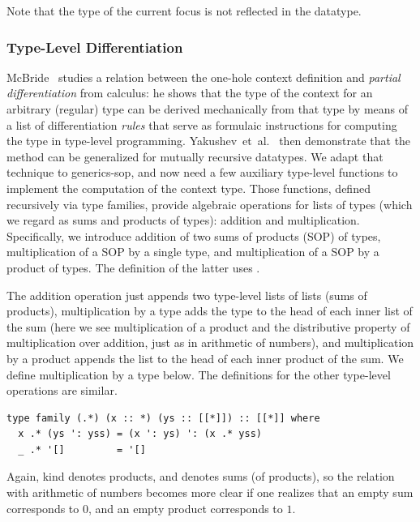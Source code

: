 \documentclass[sigplan,screen,review,anonymous]{acmart}
\begin{document}
Note that the type of the current focus is not reflected in the  datatype.

\subsubsection{Type-Level Differentiation}

McBride~\cite{McBride2001} studies a relation between the one-hole context definition and \emph{partial differentiation} from calculus: he shows that the type of the context for an arbitrary (regular) type can be derived mechanically from that type by means of a list of differentiation \emph{rules} that serve as formulaic instructions for computing the type in type-level programming. Yakushev~et~al.~\cite{MuRec2009} then demonstrate that the method can be generalized for mutually recursive datatypes. We adapt that technique to \textsf{generics-sop}, and now need a few auxiliary type-level functions to implement the computation of the context type. Those functions, defined recursively via type families, provide algebraic operations for lists of types (which we regard as sums and products of types): addition and multiplication. Specifically, we introduce addition  of two sums of products (SOP) of types, multiplication  of a SOP by a single type, and multiplication  of a SOP by a product of types. The definition of the latter uses .

The addition operation just appends two type-level lists of lists (sums of products), multiplication by a type adds the type to the head of each inner list of the sum (here we see multiplication of a product and the distributive property of multiplication over addition, just as in arithmetic of numbers), and multiplication by a product appends the list to the head of each inner product of the sum. We define multiplication by a type below. The definitions for the other type-level operations are similar.
\begin{lstlisting}[style=fancy]
type family (.*) (x :: *) (ys :: [[*]]) :: [[*]] where
  x .* (ys ': yss) = (x ': ys) ': (x .* yss)
  _ .* '[]         = '[]
\end{lstlisting}

Again, kind \K{[,*.]} denotes products, and \K{[.[,*.],]} denotes sums (of products), so the relation with arithmetic of numbers becomes more clear if one realizes that an empty sum  corresponds to $0$, and an empty product  corresponds to $1$.
\end{document}
